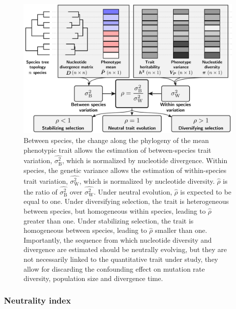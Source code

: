 \documentclass{article}
\newcommand{\RateBetween}{\sigma^2_{\mathrm{B}}}
\newcommand{\RateWhithin}{\sigma^2_{\mathrm{W}}}
\newcommand{\EstRateBetween}{\widehat{\RateBetween}}
\newcommand{\EstRateWhithin}{\widehat{\RateWhithin}}
\newcommand{\EstNI}{\widehat{\rho}}
\begin{document}
\begin{figure}[!ht]
    \centering
    \includegraphics[width=\textwidth, page=1] {figure1}
    \caption{
        Between species, the change along the phylogeny of the mean phenotypic trait allows the estimation of between-species trait variation, $\EstRateBetween$, which is normalized by nucleotide divergence.
        Within species, the genetic variance allows the estimation of within-species trait variation, $\EstRateWhithin$, which is  normalized by nucleotide diversity.
        $\EstNI$ is the ratio of $\EstRateBetween$ over $\EstRateWhithin$.
        Under neutral evolution, $\EstNI$ is expected to be equal to one.
        Under diversifying selection, the trait is heterogeneous between species, but homogeneous within species, leading to $\EstNI$ greater than one.
        Under stabilizing selection, the trait is homogeneous between species, leading to $\EstNI$ smaller than one.
        Importantly, the sequence from which nucleotide diversity and divergence are estimated should be neutrally evolving, but they are not necessarily linked to the quantitative trait under study, they allow for discarding the confounding effect on mutation rate diversity, population size and divergence time.
    }
    \label{fig:methods}
\end{figure}

\subsubsection{Neutrality index}
\end{document}

